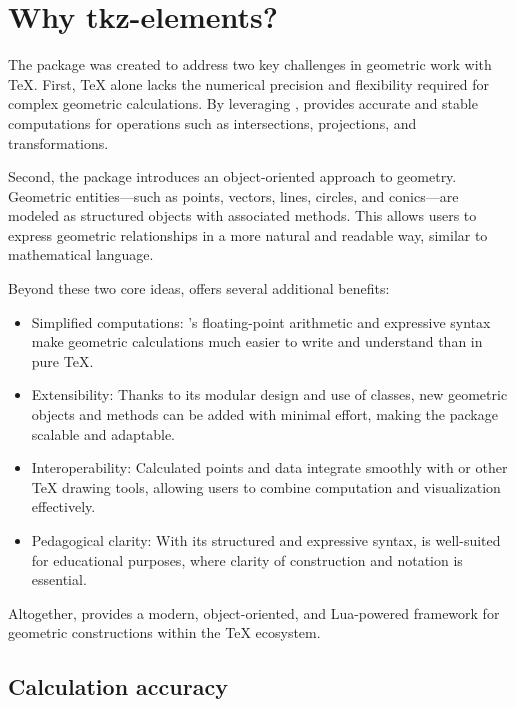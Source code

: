 \newpage
\section{Why tkz-elements?}

The  package was created to address two key challenges in geometric work with TeX. First, TeX alone lacks the numerical precision and flexibility required for complex geometric calculations. By leveraging ,  provides accurate and stable computations for operations such as intersections, projections, and transformations.

Second, the package introduces an object-oriented approach to geometry. Geometric entities—such as points, vectors, lines, circles, and conics—are modeled as structured objects with associated methods. This allows users to express geometric relationships in a more natural and readable way, similar to mathematical language.

Beyond these two core ideas,  offers several additional benefits:

\begin{itemize}

 \item  Simplified computations: 's floating-point arithmetic and expressive syntax make geometric calculations much easier to write and understand than in pure TeX.

\item   Extensibility: Thanks to its modular design and use of classes, new geometric objects and methods can be added with minimal effort, making the package scalable and adaptable.

\item   Interoperability: Calculated points and data integrate smoothly with \TIKZ{} or other TeX drawing tools, allowing users to combine computation and visualization effectively.

 \item  Pedagogical clarity: With its structured and expressive syntax,  is well-suited for educational purposes, where clarity of construction and notation is essential.
\end{itemize}

Altogether,  provides a modern, object-oriented, and Lua-powered framework for geometric constructions within the TeX ecosystem.

\subsection{Calculation accuracy}
